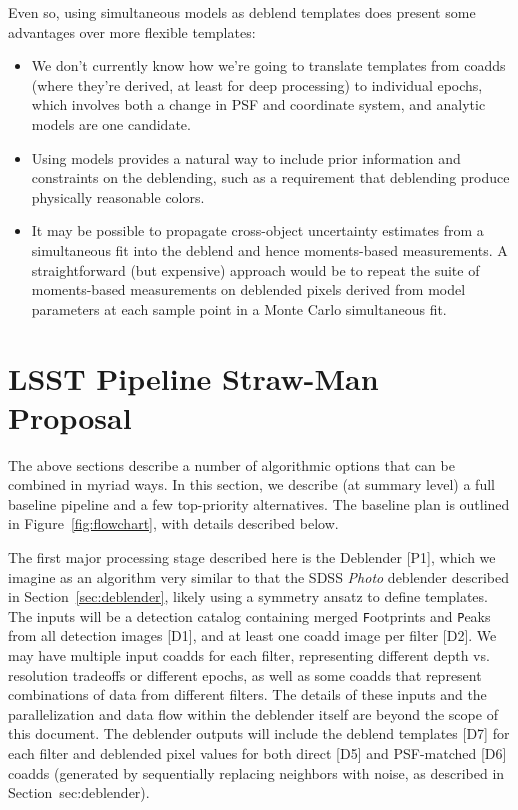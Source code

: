 \documentclass[10pt]{article}
\begin{document}
Even so, using simultaneous models as deblend templates does present some
advantages over more flexible templates:
\begin{itemize}
\item We don't currently know how we're going to translate templates from
coadds (where they're derived, at least for deep processing) to individual
epochs, which involves both a change in PSF and coordinate system, and
analytic models are one candidate.
\item Using models provides a natural way to include prior information and
constraints on the deblending, such as a requirement that deblending produce
physically reasonable colors.
\item It may be possible to propagate cross-object uncertainty estimates
from a simultaneous fit into the deblend and hence moments-based
measurements.  A straightforward (but expensive) approach would be to repeat
the suite of moments-based measurements on deblended pixels derived from model
parameters at each sample point in a Monte Carlo simultaneous fit.
\end{itemize}

\section{LSST Pipeline Straw-Man Proposal}

The above sections describe a number of algorithmic options that can be
combined in myriad ways.  In this section, we describe (at summary level) a
full baseline pipeline and a few top-priority alternatives. The baseline plan
is outlined in Figure~\ref{fig:flowchart}, with details described below.

The first major processing stage described here is the Deblender [P1], which
we imagine as an algorithm very similar to that the SDSS {\em Photo} deblender
described in Section~\ref{sec:deblender}, likely using a symmetry ansatz to
define templates.  The inputs will be a detection catalog containing merged
{\texttt Footprints} and {\texttt Peaks} from all detection images [D1], and
at least one coadd image per filter [D2].  We may have multiple input coadds
for each filter, representing different depth vs. resolution tradeoffs or
different epochs, as well as some coadds that represent combinations of data
from different filters. The details of these inputs and the parallelization
and data flow within the deblender itself are beyond the scope of this
document. The deblender outputs will include the deblend templates [D7] for
each filter and deblended pixel values for both direct [D5] and PSF-matched
[D6] coadds (generated by sequentially replacing neighbors with noise, as
described in Section~{sec:deblender}).
\end{document}
